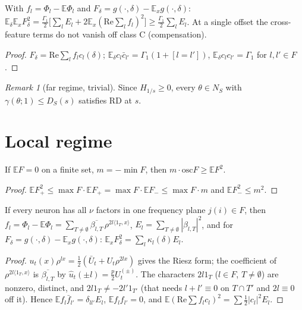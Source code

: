 \documentclass[11pt]{article}
\theoremstyle{remark}\newtheorem{remark}[theorem]{Remark}
\newcommand{\E}{\mathbb{E}}
\begin{document}
\begin{proposition} With $f_l=\Phi_l-\E\Phi_l$ and $F_\delta=g(\cdot,\delta)-\E_xg(\cdot,\delta)$:
$\E_{\delta}\E_xF_\delta^2=\frac{\Gamma_1}{2}\big[\sum_lE_l+2\E_x(\mathrm{Re}\sum_lf_l)^2\big]\ge\frac{\Gamma_1}2\sum_lE_l$.
At a single offset the cross-feature terms do not vanish off class C (compensation).\end{proposition}
\begin{proof} $F_\delta=\mathrm{Re}\sum_lf_lc_l(\delta)$; $\E_\delta c_l\bar c_{l'}=\Gamma_1(1+[l=l'])$, $\E_\delta c_lc_{l'}=\Gamma_1$ for $l,l'\in F$.\end{proof}

\begin{remark}[far regime, trivial] Since $H_{1/s}\ge0$, every $\theta\in N_S$ with $\gamma(\theta;1)\le D_S(s)$ satisfies RD at $s$.\end{remark}

\section{Local regime}
\begin{lemma}\label{mz} If $\E F=0$ on a finite set, $m=-\min F$, then $m\cdot\mathrm{osc}F\ge \E F^2$.\end{lemma}
\begin{proof} $\E F_+^2\le\max F\cdot\E F_+=\max F\cdot\E F_-\le \max F\cdot m$ and $\E F_-^2\le m^2$.\end{proof}

\begin{lemma}\label{var} If every neuron has all $\nu$ factors in one frequency plane $j(i)\in F$, then
$f_l=\Phi_l-\E\Phi_l=\sum_{T\neq\emptyset}\overline{\beta_{l,T}}\,\rho^{2l\langle 1_T,x\rangle}$, $E_l=\sum_{T\ne\emptyset}|\beta_{l,T}|^2$, and for
$F_\delta=g(\cdot,\delta)-\E_xg(\cdot,\delta)$: $\E_xF_\delta^2=\sum_l\kappa_l(\delta)E_l$.\end{lemma}
\begin{proof} $u_t(x)\rho^{lx}=\tfrac12(\bar U_t+U_t\rho^{2lx})$ gives the Riesz form; the coefficient of $\rho^{2l\langle1_T,x\rangle}$ is
$\overline{\beta_{l,T}}$ by $\hat u_t(\pm l)=\tfrac p2U_t^{(\pm)}$. The characters $2l1_T$ ($l\in F$, $T\neq\emptyset$) are nonzero, distinct, and
$2l1_T\ne-2l'1_{T'}$ (that needs $l+l'\equiv0$ on $T\cap T'$ and $2l\equiv0$ off it). Hence $\E f_l\bar f_{l'}=\delta_{ll'}E_l$, $\E f_lf_{l'}=0$, and
$\E(\mathrm{Re}\sum f_lc_l)^2=\sum\tfrac12|c_l|^2E_l$.\end{proof}
\end{document}
